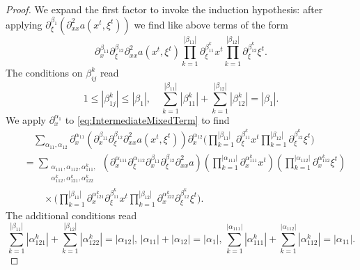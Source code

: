 \documentclass{amsart}
\theoremstyle{definition}
\begin{document}
\begin{proof}
We expand the first factor to invoke the induction hypothesis: after applying $\partial_{\xi}^{\beta_1} (\partial^2_{xx} a(x^t,\xi^t))$ we find like above terms of the form
\begin{equation}
\label{eq:IntermediateMixedTerm}
\partial_x^{\beta_{11}} \partial_{\xi}^{\beta_{12}} \partial^2_{xx} a(x^t,\xi^t) \prod_{k=1}^{|\beta_{11}|} \partial_{\xi}^{\beta_{11}^k} x^t \prod_{k=1}^{|\beta_{12}|} \partial_{\xi}^{\beta_{12}^k} \xi^t.
\end{equation}
The conditions on $\beta_{ij}^k$ read
\begin{equation*}
1 \leq |\beta_{1j}^k| \leq |\beta_1|, \quad \sum_{k=1}^{|\beta_{11}|} |\beta_{11}^k| + \sum_{k=1}^{|\beta_{12}|} |\beta_{12}^k| =  |\beta_1|.
\end{equation*}
We apply $\partial_x^{\alpha_1}$ to \eqref{eq:IntermediateMixedTerm} to find
\begin{equation*}
\begin{split}
&\quad \sum_{\alpha_{11},\alpha_{12}} \partial_x^{\alpha_{11}} (\partial_x^{\beta_{11}} \partial_{\xi}^{\beta_{12}} \partial^2_{xx} a(x^t,\xi^t)) \partial_x^{\alpha_{12}} \big( \prod_{k=1}^{|\beta_{11}|} \partial_{\xi}^{\beta_{11}^k} x^t \prod_{k=1}^{|\beta_{12}|} \partial_{\xi}^{\beta_{12}^k} \xi^t \big) \\
&= \sum_{\substack{\alpha_{111},\alpha_{112},\alpha_{111}^k, \\ \alpha_{112}^k, \alpha_{121}^k, \alpha_{122}^k}} (\partial_x^{\alpha_{111}} \partial_{\xi}^{\alpha_{112}} \partial_x^{\beta_{11}} \partial_{\xi}^{\beta_{12}} \partial^2_{xx} a) ( \prod_{k=1}^{|\alpha_{111}|} \partial_x^{\alpha_{111}^k} x^t ) (\prod_{k=1}^{|\alpha_{112}|} \partial_x^{\alpha_{112}^k} \xi^t) \\
&\quad \quad \times \big( \prod_{k=1}^{|\beta_{11}|} \partial_x^{\alpha_{121}^k} \partial_{\xi}^{\beta_{11}^k} x^t \prod_{k=1}^{|\beta_{12}|} \partial_x^{\alpha_{122}^k} \partial_{\xi}^{\beta_{12}^k} \xi^t \big).
\end{split}
\end{equation*}
The additional conditions read
\begin{equation*}
\sum_{k=1}^{|\beta_{11}|} |\alpha_{121}^k| + \sum_{k=1}^{|\beta_{12}|} |\alpha_{122}^k| = |\alpha_{12}|, \, |\alpha_{11}| + |\alpha_{12}| = |\alpha_1|, \, \sum_{k=1}^{|\alpha_{111}|} |\alpha_{111}^k| + \sum_{k=1}^{|\alpha_{112}|} |\alpha_{112}^k| = |\alpha_{11}|.
\end{equation*}


\end{proof}
\end{document}
